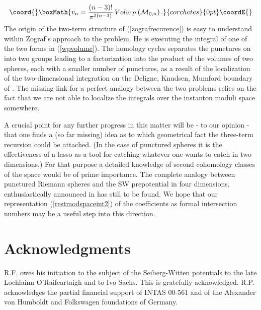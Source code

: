 \documentclass[a4paper,12pt]{article}
\begin{document}
\[\coord{}\boxMath{
v_n =\frac{(n-3)!}{\pi^{2(n-3)}} \,Vol_{WP}\left({\cal M}_{0,n}\right).
}{corchetes}{0pt}\coordE{}\]
The origin of the two-term structure of (\ref{zografrecurence}) 
is easy to understand within Zograf's approach to the problem. He 
is executing the integral of one of the \coordHE{} two forms in 
(\ref{wpvolume}). The homology cycles separates the punctures 
on \coordHE{} into two groups leading 
to a factorization into the product of the volumes of two spheres, 
each with a smaller number of punctures, as a result of the 
localization of the two-dimensional integration on the Deligne, 
Knudsen, Mumford boundary \cite{deligne} of \coordHE{}. 
The missing link for a perfect analogy between the two problems 
relies on the fact that we are not able to localize the integrals 
over the instanton moduli space somewhere. 

A crucial 
point for any further progress in this matter will be - to our 
opinion - that one finds a (so far missing) idea as to which geometrical 
fact the three-term recursion could be attached. (In the case 
of punctured spheres it is the effectiveness of a lasso as 
a tool for catching whatever one wants to catch in two dimensions.)
For that purpose a detailed knowledge of second cohomology classes 
\coordHE{} of the space \coordHE{} would be of prime importance. 
The complete analogy between punctured Riemann spheres and 
the SW prepotential in four dimensions, enthusiastically announced 
in \cite{matone1} has still to be found. We hope that our 
representation (\ref{restmodspaceint2}) of the coefficients 
\coordHE{} as formal 
intersection numbers may be a useful step into this direction.   

\section*{Acknowledgments}
R.F. owes his initiation to the subject of the Seiberg-Witten 
potentials to the late Lochlainn O'Raifeartaigh and to Ivo Sachs. 
This is gratefully  acknowledged.
R.P. acknowledges the partial financial support of INTAS 00-561 
and of the Alexander von Humboldt and Folkswagen foundations of Germany.
\end{document}
